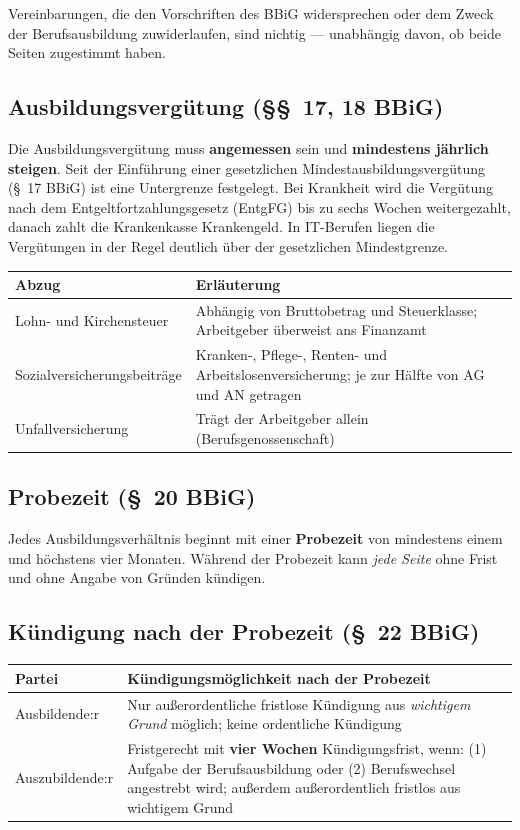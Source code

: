 \documentclass[11pt, a4paper]{article}
\begin{document}
Vereinbarungen, die den Vorschriften des BBiG widersprechen oder dem Zweck der
Berufsausbildung zuwiderlaufen, sind nichtig --- unabhängig davon, ob beide Seiten
zugestimmt haben.

\subsection{Ausbildungsvergütung (§§~17, 18 BBiG)}

Die Ausbildungsvergütung muss \textbf{angemessen} sein und \textbf{mindestens jährlich
steigen}. Seit der Einführung einer gesetzlichen Mindestausbildungsvergütung (§~17 BBiG) ist
eine Untergrenze festgelegt. Bei Krankheit wird die Vergütung nach dem
Entgeltfortzahlungsgesetz (EntgFG) bis zu sechs Wochen weitergezahlt, danach zahlt die
Krankenkasse Krankengeld. In IT-Berufen liegen die Vergütungen in der Regel deutlich über
der gesetzlichen Mindestgrenze.

\begin{center}
\begin{tabular}{p{5cm} p{8cm}}
\toprule
\textbf{Abzug} & \textbf{Erläuterung}\\
\midrule
Lohn- und Kirchensteuer & Abhängig von Bruttobetrag und Steuerklasse; Arbeitgeber überweist ans Finanzamt\\
Sozialversicherungsbeiträge & Kranken-, Pflege-, Renten- und Arbeitslosenversicherung; je zur Hälfte von AG und AN getragen\\
Unfallversicherung & Trägt der Arbeitgeber allein (Berufsgenossenschaft)\\
\bottomrule
\end{tabular}
\end{center}

\subsection{Probezeit (§~20 BBiG)}

Jedes Ausbildungsverhältnis beginnt mit einer \textbf{Probezeit} von mindestens einem und
höchstens vier Monaten. Während der Probezeit kann \emph{jede Seite} ohne Frist und ohne
Angabe von Gründen kündigen.

\subsection{Kündigung nach der Probezeit (§~22 BBiG)}

\begin{center}
\begin{tabular}{p{5cm} p{8cm}}
\toprule
\textbf{Partei} & \textbf{Kündigungsmöglichkeit nach der Probezeit}\\
\midrule
Ausbildende:r & Nur außerordentliche fristlose Kündigung aus \emph{wichtigem Grund} möglich; keine ordentliche Kündigung\\
Auszubildende:r & Fristgerecht mit \textbf{vier Wochen} Kündigungsfrist, wenn: (1) Aufgabe der Berufsausbildung oder (2) Berufswechsel angestrebt wird; außerdem außerordentlich fristlos aus wichtigem Grund\\
\bottomrule
\end{tabular}
\end{center}
\end{document}

